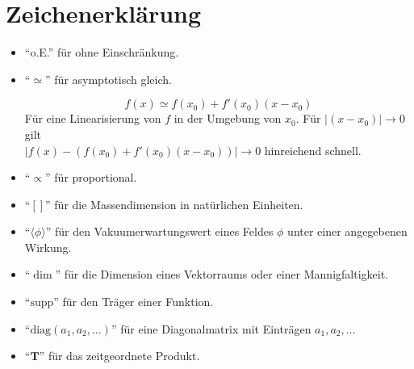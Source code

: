 \clearpage
\section*{Zeichenerklärung}

\begin{itemize}
\item "`o.E."' für ohne Einschränkung.

\item "`$\simeq$"' für asymptotisch gleich.
	\begin{beispiel}
	 \begin{equation}
	  f(x)\simeq f(x_0)+f'(x_0)(x-x_0)
	 \end{equation}
	  Für eine Linearisierung von $f$ in der Umgebung von $x_0$. Für 
	  $
	  \left|(x-x_0)\right|\rightarrow 0
	  $
	  gilt \\ 
	  $
	  \left|f(x)-\left(f(x_0)+f'(x_0)(x-x_0)\right)\right|\rightarrow 0 
	  $
	  hinreichend schnell.
	\end{beispiel}

  \item "`$\propto$"' für proportional.
	
	
  \item "`$[]$"' für die Massendimension in natürlichen Einheiten.
  
  \item "`$\Big\langle \phi \Big\rangle$"' für den Vakuumerwartungswert eines Feldes $\phi$ 
	  unter einer angegebenen Wirkung.
  
  \item "`$\dim$"' für die Dimension eines Vektorraums oder einer Mannigfaltigkeit.

  \item "`$\text{supp}$"' für den Träger einer Funktion.
	
  \item "`$\text{diag}(a_1,a_2,\ldots)$"' für eine Diagonalmatrix mit Einträgen $a_1,a_2,\ldots$


  \item "`$\textbf{T}$"' für das zeitgeordnete Produkt.
  

\end{itemize}

